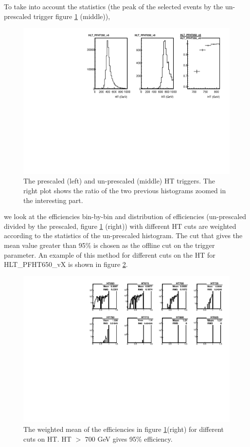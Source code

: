 To take into account the statistics (the peak of the selected events by the un-prescaled trigger figure \ref{fig.TriggerPlateau} (middle)),
\begin{figure}[!htb]
\centering
\includegraphics[width=1.0\textwidth]{figs/TriggerDemonstration.pdf}
\caption{The prescaled (left) and  un-prescaled (middle) HT triggers. The right plot shows the ratio of the two previous histograms 
zoomed in the interesting part.}
\label{fig.TriggerPlateau}
\end{figure}
we look at the efficiencies bin-by-bin and distribution of efficiencies (un-prescaled divided by the prescaled, 
figure \ref{fig.TriggerPlateau} (right)) 
with different HT cuts are weighted according to the statistics of the un-prescaled histogram. 
The cut that gives the mean value greater than 95\% is chosen as the offline cut on the trigger parameter. 
An example of this method for different cuts on the HT for HLT\_PFHT650\_vX is shown in figure \ref{fig.TriggerEff}.
\begin{figure}[!htb]
\centering
\includegraphics[width=1.0\textwidth]{figs/TriggerDemonstrationEff.pdf}
\caption{The weighted mean of the efficiencies in figure \ref{fig.TriggerPlateau}(right) for different cuts on HT. 
HT $>$ 700 GeV gives 95\% efficiency.}
\label{fig.TriggerEff}
\end{figure}

